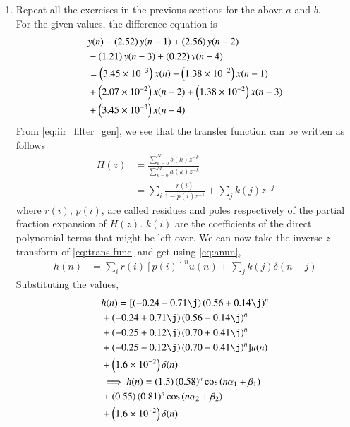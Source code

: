 \documentclass[journal,12pt,twocolumn]{IEEEtran}
\renewcommand\thesection{\arabic{section}}
\begin{document}
\begin{enumerate}[label=\thesection.\arabic*]
%
\item Repeat all the exercises in the previous sections for the above $a$ and $b$.\\
\solution
For the given values, the difference equation is
\begin{align}
	&y(n) - \left(2.52\right)y(n - 1) + \left(2.56\right)y(n - 2) \nonumber \\
	&- \left(1.21\right)y(n - 3) + \left(0.22\right)y(n - 4) \nonumber \\
	&= \left(3.45 \times 10^{-3}\right)x(n) + \left(1.38 \times 10^{-2}\right)x(n - 1) \nonumber \\
	&+ \left(2.07 \times 10^{-2}\right)x(n - 2) + \left(1.38 \times 10^{-2}\right)x(n - 3) \nonumber \\
	&+ \left(3.45 \times 10^{-3}\right)x(n - 4)
\end{align}
From \eqref{eq:iir_filter_gen}, we see that the transfer function can be written as follows
\begin{align}
	H(z) &= \frac{\sum_{k = 0}^{N}b(k)z^{-k}}{\sum_{k = 0}^{M}a(k)z^{-k}} \\
		 &= \sum_{i}\frac{r(i)}{1 - p(i)z^{-1}} + \sum_{j}k(j)z^{-j}
	\label{eq:trans-func}
\end{align}
where $r(i)$, $p(i)$, are called residues and poles respectively of the partial 
fraction expansion of $H(z)$. $k(i)$ are the coefficients of the direct polynomial 
terms that might be left over. We can now take the inverse $z$-transform of
\eqref{eq:trans-func} and get using \eqref{eq:anun},
\begin{align}
	h(n) &= \sum_{i}r(i)[p(i)]^nu(n) + \sum_{j}k(j)\delta(n - j)
	\label{eq:h-n-expr}
\end{align}
Substituting the values,
\begin{align}
	&h(n) = [\brak{-0.24-0.71\j}\brak{0.56+0.14\j}^n \nonumber \\
	&+ \brak{-0.24+0.71\j}\brak{0.56-0.14\j}^n \nonumber \\
	&+ \brak{-0.25+0.12\j}\brak{0.70+0.41\j}^n \nonumber \\
	&+ \brak{-0.25-0.12\j}\brak{0.70-0.41\j}^n]u(n) \nonumber \\
	&+ \brak{1.6 \times 10^{-2}}\delta(n) \\
	&\implies h(n) = \brak{1.5}\brak{0.58}^n\cos\brak{n\alpha_1 + \beta_1} \nonumber \\
	&+ \brak{0.55}\brak{0.81}^n\cos\brak{n\alpha_2 + \beta_2} \nonumber \\
	&+ \brak{1.6 \times 10^{-2}}\delta(n)
	\label{eq:h-n-real}
\end{align}

\end{enumerate}
\end{document}
